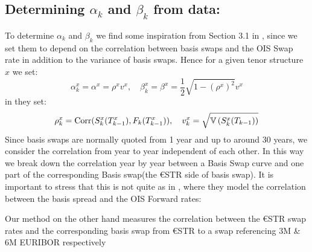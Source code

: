 \documentclass[12pt]{article}
\begin{document}
\subsection{Determining $\alpha_k$ and $\beta_k$ from data:} %
\label{sub:determining_depedence}
To determine $\alpha_k$ and $\beta_k$
we find some inspiration from Section 3.1 in \cite{MercXieStochBasis2012},
since we set them to depend
on the correlation between basis swaps and the OIS Swap rate in
addition to the variance of basis swaps. Hence
for a given tenor structure $x$ we set:
\begin{equation}
     \alpha^x_k = \alpha^x = \rho ^{x} v^{x},
     \quad\beta_k^x = \beta^x = \frac{1}{2}\sqrt{1- ( \rho^{x})^2}v^x
\end{equation}
in \cite{MercXieStochBasis2012} they
set:
\begin{equation}
     \notag \rho_k ^x = \text{Corr}(S_k^x(T_{k-1}^x) , F_k(T_{k-1}^x)),
     \quad v^x_k = \sqrt{\mathbb{V}\left( S_k^x(T_{k-1}) \right) }
 \end{equation}
Since basis swaps are normally
quoted from 1 year and up to around 30 years,
we consider the correlation from year to year independent of each other.
In this way we break down the
correlation year by year between a Basis Swap curve and
one part of the corresponding Basis
swap(the €STR side of basis swap).
It is important to stress that this is not
quite as in \cite{MercXieStochBasis2012}, where they
model the correlation between the basis spread and
the OIS Forward rates:

Our method on the other hand measures the correlation between
the €STR swap rates and the corresponding
basis swap from €STR to a swap referencing
3M \& 6M EURIBOR respectively \newline
\end{document}
